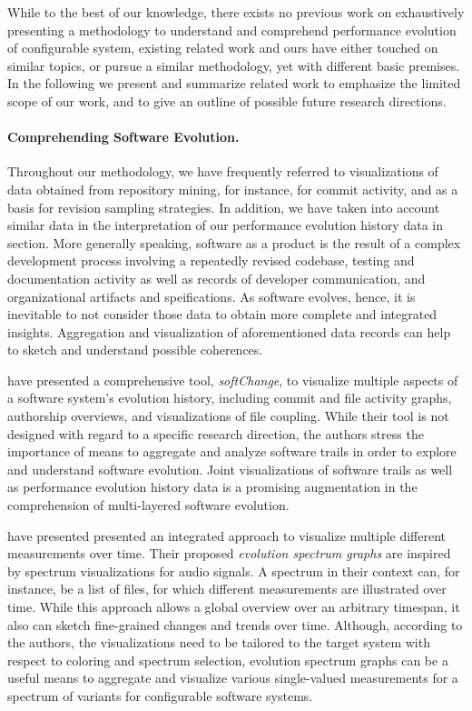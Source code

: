 While to the best of our knowledge, there exists no previous work on
exhaustively presenting a methodology to understand and comprehend performance
evolution of configurable system, existing related work and ours have either
touched on similar topics, or pursue a similar methodology, yet with different
basic premises. In the following we present and summarize related work to
emphasize the limited scope of our work, and to give an outline of possible
future research directions.

\paragraph{Comprehending Software Evolution.} Throughout our methodology, we
have frequently referred to visualizations of data obtained from repository
mining, for instance, for commit activity, and as a basis for revision sampling
strategies. In addition, we have taken into account similar data in the
interpretation of our performance evolution history data in section. More
generally speaking, software as a product is the result of a complex
development process involving a repeatedly revised codebase, testing and
documentation activity as well as records of developer communication, and
organizational artifacts and speifications. As software evolves, hence, it is
inevitable to not consider those data to obtain more complete and integrated
insights. Aggregation and visualization of aforementioned data records can help
to sketch and understand possible coherences.

\cite{german_visualizing_2006} have presented a comprehensive tool,
\emph{softChange}, to visualize multiple aspects of a software system’s
evolution history, including commit and file activity graphs, authorship
overviews, and visualizations of file coupling. While their tool is not
designed with regard to a specific research direction, the authors stress the
importance of means to aggregate and analyze software trails in order to
explore and understand software evolution. Joint visualizations
of software trails as well as performance evolution history data is a promising
augmentation in the comprehension of multi-layered software evolution.

\cite{wu_exploring_2004} have presented presented an integrated approach to
visualize multiple different measurements over time. Their proposed
\emph{evolution spectrum graphs} are inspired by spectrum visualizations for
audio signals. A spectrum in their context can, for instance,  be a list of files, for which
different measurements are illustrated over time. While this approach allows a
global overview over an arbitrary timespan, it also can sketch fine-grained
changes and trends over time. Although, according to the authors, the
visualizations need to be tailored to the target system with respect to
coloring and spectrum selection, evolution spectrum graphs can be a useful
means to aggregate and visualize various single-valued measurements for a
spectrum of variants for configurable software systems.

